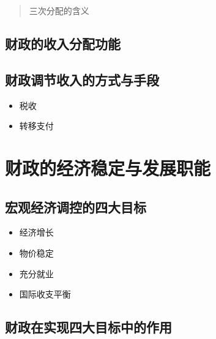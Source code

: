 \documentclass[
]{book}
\providecommand{\tightlist}{%
  \setlength{\itemsep}{0pt}\setlength{\parskip}{0pt}}
\theoremstyle{definition}
\theoremstyle{definition}
\theoremstyle{definition}
\theoremstyle{definition}
\theoremstyle{remark}
\begin{document}
\begin{quote}
三次分配的含义
\end{quote}

\hypertarget{ux8d22ux653fux7684ux6536ux5165ux5206ux914dux529fux80fd}{%
\subsection{财政的收入分配功能}\label{ux8d22ux653fux7684ux6536ux5165ux5206ux914dux529fux80fd}}

\hypertarget{ux8d22ux653fux8c03ux8282ux6536ux5165ux7684ux65b9ux5f0fux4e0eux624bux6bb5}{%
\subsection{财政调节收入的方式与手段}\label{ux8d22ux653fux8c03ux8282ux6536ux5165ux7684ux65b9ux5f0fux4e0eux624bux6bb5}}

\begin{itemize}
\tightlist
\item
  税收
\item
  转移支付
\end{itemize}

\hypertarget{ux8d22ux653fux7684ux7ecfux6d4eux7a33ux5b9aux4e0eux53d1ux5c55ux804cux80fd}{%
\section{财政的经济稳定与发展职能}\label{ux8d22ux653fux7684ux7ecfux6d4eux7a33ux5b9aux4e0eux53d1ux5c55ux804cux80fd}}

\hypertarget{ux5b8fux89c2ux7ecfux6d4eux8c03ux63a7ux7684ux56dbux5927ux76eeux6807}{%
\subsection{宏观经济调控的四大目标}\label{ux5b8fux89c2ux7ecfux6d4eux8c03ux63a7ux7684ux56dbux5927ux76eeux6807}}

\begin{itemize}
\tightlist
\item
  经济增长
\item
  物价稳定
\item
  充分就业
\item
  国际收支平衡
\end{itemize}

\hypertarget{ux8d22ux653fux5728ux5b9eux73b0ux56dbux5927ux76eeux6807ux4e2dux7684ux4f5cux7528}{%
\subsection{财政在实现四大目标中的作用}\label{ux8d22ux653fux5728ux5b9eux73b0ux56dbux5927ux76eeux6807ux4e2dux7684ux4f5cux7528}}
\end{document}
